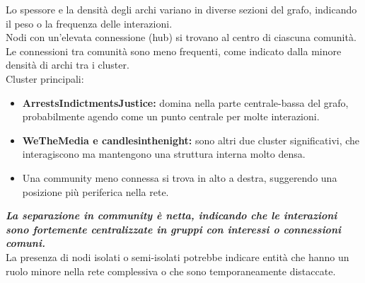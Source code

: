 \documentclass[12pt]{article}
\begin{document}
Lo spessore e la densità degli archi variano in diverse sezioni del grafo, indicando il peso o la frequenza delle interazioni.\\
Nodi con un'elevata connessione (hub) si trovano al centro di ciascuna comunità.\\
Le connessioni tra comunità sono meno frequenti, come indicato dalla minore densità di archi tra i cluster.\\
Cluster principali:
\begin{itemize}[label=]
	\item \textbf{ArrestsIndictmentsJustice:} domina nella parte centrale-bassa del grafo, probabilmente agendo come un punto centrale per molte interazioni.
	\item \textbf{WeTheMedia e candlesinthenight:} sono altri due cluster significativi, che interagiscono ma mantengono una struttura interna molto densa.
	\item Una community meno connessa si trova in alto a destra, suggerendo una posizione più periferica nella rete.
\end{itemize}
\textbf{\textit{La separazione in community è netta, indicando che le interazioni sono fortemente centralizzate in gruppi con interessi o connessioni comuni.}}\\
La presenza di nodi isolati o semi-isolati potrebbe indicare entità che hanno un ruolo minore nella rete complessiva o che sono temporaneamente distaccate.
\newpage
\end{document}
